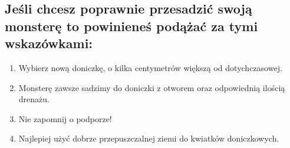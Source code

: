\subsection{Jeśli chcesz poprawnie przesadzić swoją monsterę to powinieneś podążać za tymi wskazówkami:}
    \begin{enumerate}
        \item Wybierz nową doniczkę, o kilka centymetrów większą od dotychczasowej.
        \item Monsterę zawsze sadzimy do doniczki z otworem oraz odpowiednią ilością drenażu.
        \item Nie zapomnij o podporze!
        \item Najlepiej użyć dobrze przepuszczalnej ziemi do kwiatków doniczkowych.
    \end{enumerate}

